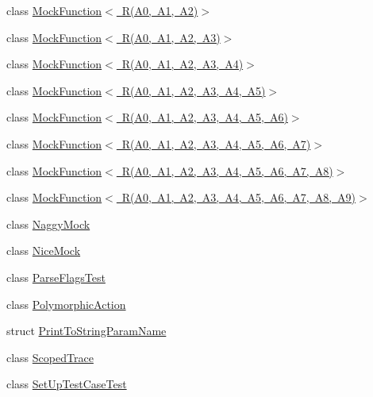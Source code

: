 \begin{DoxyCompactItemize}
\item 
class \mbox{\hyperlink{classtesting_1_1_mock_function_3_01_r_07_a0_00_01_a1_00_01_a2_08_4}{Mock\+Function$<$ R(\+A0, A1, A2)$>$}}
\item 
class \mbox{\hyperlink{classtesting_1_1_mock_function_3_01_r_07_a0_00_01_a1_00_01_a2_00_01_a3_08_4}{Mock\+Function$<$ R(\+A0, A1, A2, A3)$>$}}
\item 
class \mbox{\hyperlink{classtesting_1_1_mock_function_3_01_r_07_a0_00_01_a1_00_01_a2_00_01_a3_00_01_a4_08_4}{Mock\+Function$<$ R(\+A0, A1, A2, A3, A4)$>$}}
\item 
class \mbox{\hyperlink{classtesting_1_1_mock_function_3_01_r_07_a0_00_01_a1_00_01_a2_00_01_a3_00_01_a4_00_01_a5_08_4}{Mock\+Function$<$ R(\+A0, A1, A2, A3, A4, A5)$>$}}
\item 
class \mbox{\hyperlink{classtesting_1_1_mock_function_3_01_r_07_a0_00_01_a1_00_01_a2_00_01_a3_00_01_a4_00_01_a5_00_01_a6_08_4}{Mock\+Function$<$ R(\+A0, A1, A2, A3, A4, A5, A6)$>$}}
\item 
class \mbox{\hyperlink{classtesting_1_1_mock_function_3_01_r_07_a0_00_01_a1_00_01_a2_00_01_a3_00_01_a4_00_01_a5_00_01_a6_00_01_a7_08_4}{Mock\+Function$<$ R(\+A0, A1, A2, A3, A4, A5, A6, A7)$>$}}
\item 
class \mbox{\hyperlink{classtesting_1_1_mock_function_3_01_r_07_a0_00_01_a1_00_01_a2_00_01_a3_00_01_a4_00_01_a5_00_01_a6_00_01_a7_00_01_a8_08_4}{Mock\+Function$<$ R(\+A0, A1, A2, A3, A4, A5, A6, A7, A8)$>$}}
\item 
class \mbox{\hyperlink{classtesting_1_1_mock_function_3_01_r_07_a0_00_01_a1_00_01_a2_00_01_a3_00_01_a4_00_01_a5_00_01_a654a9d62da83bde10dfec0368733bb48}{Mock\+Function$<$ R(\+A0, A1, A2, A3, A4, A5, A6, A7, A8, A9)$>$}}
\item 
class \mbox{\hyperlink{classtesting_1_1_naggy_mock}{Naggy\+Mock}}
\item 
class \mbox{\hyperlink{classtesting_1_1_nice_mock}{Nice\+Mock}}
\item 
class \mbox{\hyperlink{classtesting_1_1_parse_flags_test}{Parse\+Flags\+Test}}
\item 
class \mbox{\hyperlink{classtesting_1_1_polymorphic_action}{Polymorphic\+Action}}
\item 
struct \mbox{\hyperlink{structtesting_1_1_print_to_string_param_name}{Print\+To\+String\+Param\+Name}}
\item 
class \mbox{\hyperlink{classtesting_1_1_scoped_trace}{Scoped\+Trace}}
\item 
class \mbox{\hyperlink{classtesting_1_1_set_up_test_case_test}{Set\+Up\+Test\+Case\+Test}}

\end{DoxyCompactItemize}
